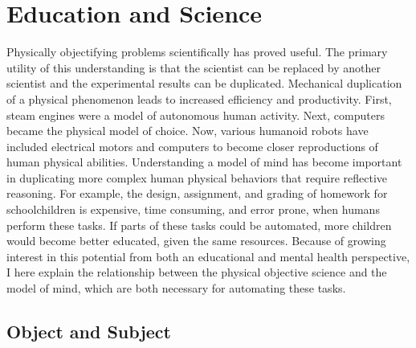 \chapter{Education and Science}
\label{chapter:education_and_science}

Physically objectifying problems scientifically has proved useful.
The primary utility of this understanding is that the scientist can be
replaced by another scientist and the experimental results can be
duplicated.  Mechanical duplication of a physical phenomenon leads to
increased efficiency and productivity.  First, steam engines were a
model of autonomous human activity.  Next, computers became the
physical model of choice.  Now, various humanoid robots have included
electrical motors and computers to become closer reproductions of
human physical abilities.  Understanding a model of mind has become
important in duplicating more complex human physical behaviors that
require reflective reasoning.  For example, the design, assignment,
and grading of homework for schoolchildren is expensive, time
consuming, and error prone, when humans perform these tasks.  If parts
of these tasks could be automated, more children would become better
educated, given the same resources.  Because of growing interest in
this potential from both an educational and mental health perspective,
I here explain the relationship between the physical objective science
and the model of mind, which are both necessary for automating these
tasks.

\section{Object and Subject}

